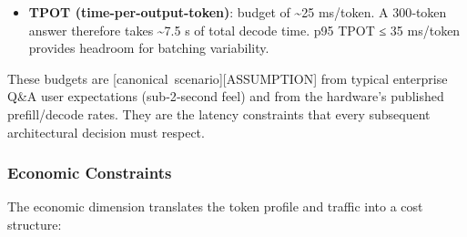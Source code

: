\begin{itemize}
  is the p95 ceiling the budget relaxes to, and any pass/fail judgement
  on a measured distribution is made against the p95 ceiling, not the
  budget. \textbf{TTFT\_e2e convention (used throughout):}
  \(\text{TTFT}_{\text{e2e}} = \text{retrieval} + \text{admission/queue} + \text{tokenization/transfer} + \text{prefill}\).
  Here the 1.2 s budget names the \emph{two dominant modeled terms} ---
  retrieval (\textasciitilde120 ms) + prefill (\textasciitilde1.08 s)
  --- and the 1.08 s is therefore a \textbf{two-term-only upper reach,
  NOT a feasible deployed prefill target}: it leaves zero allowance for
  admission/queue and tokenization/transfer, which are positive. Write
  it as \texttt{budget\_prefill\ ≤\ 1.08\ s\ −\ B\_other} until
  measurement supplies B\_other; every ``meets 1.2 s'' statement needs a
  named tested workload and end-to-end timing (see the ``Prefill compute
  budget --- two-term-only upper cap, NOT a feasible deployed prefill
  target'' row in \hyperref[tab:4.2]{Table 4-2}). The 1.2 s is an \textbf{aspirational SLO
  budget} (a sub-2-second user-experience target), not a demonstrated
  p95 TTFT from a benchmark; the ≤2 s p95 is the budgeted ceiling, and
  the demonstrated value under load requires an actual measurement.
\item
  \textbf{TPOT (time-per-output-token)}: budget of \textasciitilde25
  ms/token. A 300‑token answer therefore takes \textasciitilde7.5 s of
  total decode time. p95 TPOT ≤ 35 ms/token provides headroom for
  batching variability.
\end{itemize}

These budgets are \mbox{{[}canonical scenario{]}}\hspace{0pt}\mbox{{[}ASSUMPTION{]}} from typical
enterprise Q\&A user expectations (sub‑2‑second feel) and from the
hardware's published prefill/decode rates. They are the latency
constraints that every subsequent architectural decision must respect.

\subsubsection{Economic Constraints}\label{economic-constraints}

The economic dimension translates the token profile and traffic into a
cost structure:


